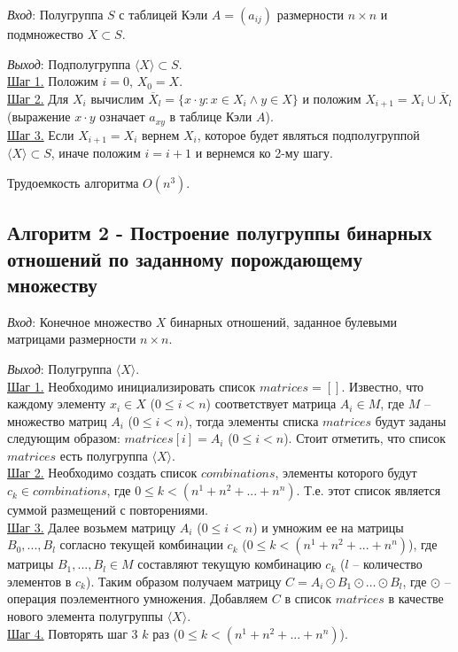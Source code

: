 \documentclass[spec, och, labwork]{shiza}
\begin{document}
        \textit{Вход}: Полугруппа $S$ с таблицей Кэли $A = (a_{ij})$ размерности $n \times n$ и подмножество $X \subset S$.

        \textit{Выход}: Подполугруппа $\langle X \rangle \subset S$.\\
        \underline{Шаг 1.} Положим $i = 0$, $X_0 = X$.\\
        \underline{Шаг 2.} Для $X_i$ вычислим $\overline{X}_l = \{x \cdot y : x \in X_i \wedge y \in X \}$ и положим $X_{i + 1} = X_i \cup \overline{X}_l$ (выражение $x \cdot y$ означает $a_{xy}$ в таблице Кэли $A$). \\
        \underline{Шаг 3.} Если $X_{i + 1} = X_i$ вернем $X_i$, которое будет являться подполугруппой $\langle X \rangle \subset S$, иначе положим $i=i+1$ и вернемся ко 2-му шагу.
    
        Трудоемкость алгоритма $O(n^3)$.

    \subsection{Алгоритм 2 - Построение полугруппы бинарных отношений по заданному порождающему множеству}

        \textit{Вход}: Конечное множество $X$ бинарных отношений, заданное булевыми матрицами размерности $n \times n$.

        \textit{Выход}: Полугруппа $\langle X \rangle$.\\
        \underline{Шаг 1.} Необходимо инициализировать список $matrices = []$. Известно, что каждому элементу $x_i \in X$ ($0 \leq i < n$)
        соответствует матрица $A_i \in M$, где $M$ -- множество матриц $A_i$ ($0 \leq i < n$), тогда элементы списка $matrices$ будут
        заданы следующим образом: $matrices[i] = A_i$ ($0 \leq i < n$). Стоит отметить, что список $matrices$ есть полугруппа $\langle X \rangle$.\\
        \underline{Шаг 2.} Необходимо создать список $combinations$, элементы которого будут $c_k \in combinations$, где $0 \leq k < (n^1 + n^2 + ... + n^n)$.
        Т.е. этот список является суммой размещений с повторениями.\\
        \underline{Шаг 3.} Далее возьмем матрицу $A_i$ ($0 \leq i < n$) и умножим ее на матрицы $B_0, ..., B_l$ согласно текущей комбинации $c_k$ 
        ($0 \leq k < (n^1 + n^2 + ... + n^n)$), где матрицы $B_1, ..., B_l \in M$ составляют текущую комбинацию $c_k$ ($l$ -- количество элементов в $c_k$).
        Таким образом получаем матрицу $C = A_i \odot B_1 \odot \dots \odot B_l$, где $\odot$ -- операция поэлементного умножения. 
        Добавляем $C$ в список $matrices$ в качестве нового элемента полугруппы $\langle X \rangle$.\\
        \underline{Шаг 4.} Повторять шаг 3 $k$ раз ($0 \leq k < (n^1 + n^2 + ... + n^n)$). \\
\end{document}
